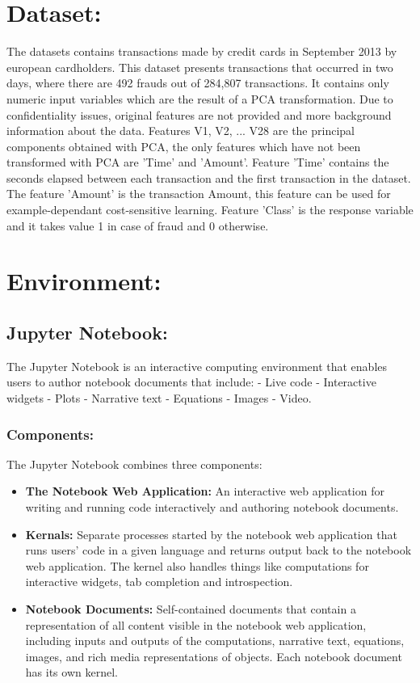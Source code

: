 \documentclass{report}
\begin{document}
\section{Dataset: }
The datasets contains transactions made by credit cards in September 2013 by european cardholders. This dataset presents transactions that occurred in two days, where there are  492 frauds out of 284,807 transactions.
It contains only numeric input variables which are the result of a PCA transformation. Due to confidentiality issues, original features are not provided and more background information about the data. Features V1, V2, ... V28 are the principal components obtained with PCA, the only features which have not been transformed with PCA are 'Time' and 'Amount'. Feature 'Time' contains the seconds elapsed between each transaction and the first transaction in the dataset. The feature 'Amount' is the transaction Amount, this feature can be used for example-dependant cost-sensitive learning. Feature 'Class' is the response variable and it takes value 1 in case of fraud and 0 otherwise.

\section{Environment: }
\subsection{Jupyter Notebook: }
The Jupyter Notebook is an interactive computing environment that enables users to author notebook documents that include: - Live code - Interactive widgets - Plots - Narrative text - Equations - Images - Video.

\subsubsection{Components: } The Jupyter Notebook combines three components:

\begin{itemize}
\item \textbf{The Notebook Web Application: } An interactive web application for writing and running code interactively and authoring notebook documents.

\item \textbf{Kernals: } Separate processes started by the notebook web application that runs users’ code in a given language and returns output back to the notebook web application. The kernel also handles things like computations for interactive widgets, tab completion and introspection.

\item \textbf{Notebook Documents: } Self-contained documents that contain a representation of all content visible in the notebook web application, including inputs and outputs of the computations, narrative text, equations, images, and rich media representations of objects. Each notebook document has its own kernel.

\end{itemize}
\end{document}
